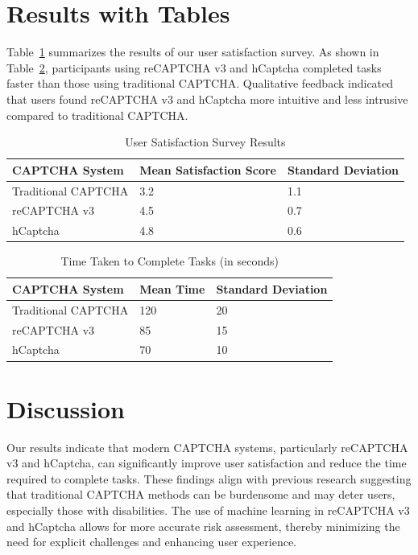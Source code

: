 \documentclass{article}
\begin{document}
\section{Results with Tables}
Table~\ref{tab:user_satisfaction} summarizes the results of our user satisfaction survey. As shown in Table~\ref{tab:task_time}, participants using reCAPTCHA v3 and hCaptcha completed tasks faster than those using traditional CAPTCHA. Qualitative feedback indicated that users found reCAPTCHA v3 and hCaptcha more intuitive and less intrusive compared to traditional CAPTCHA.

\begin{table}[htbp]
\centering
\caption{User Satisfaction Survey Results}
\label{tab:user_satisfaction}
\begin{tabular}{@{}lll@{}}
\toprule
\textbf{CAPTCHA System} & \textbf{Mean Satisfaction Score} & \textbf{Standard Deviation} \\ \midrule
Traditional CAPTCHA & 3.2 & 1.1 \\
reCAPTCHA v3 & 4.5 & 0.7 \\
hCaptcha & 4.8 & 0.6 \\ \bottomrule
\end{tabular}
\end{table}

\begin{table}[htbp]
\centering
\caption{Time Taken to Complete Tasks (in seconds)}
\label{tab:task_time}
\begin{tabular}{@{}lll@{}}
\toprule
\textbf{CAPTCHA System} & \textbf{Mean Time} & \textbf{Standard Deviation} \\ \midrule
Traditional CAPTCHA & 120 & 20 \\
reCAPTCHA v3 & 85 & 15 \\
hCaptcha & 70 & 10 \\ \bottomrule
\end{tabular}
\end{table}

\section{Discussion}
Our results indicate that modern CAPTCHA systems, particularly reCAPTCHA v3 and hCaptcha, can significantly improve user satisfaction and reduce the time required to complete tasks. These findings align with previous research suggesting that traditional CAPTCHA methods can be burdensome and may deter users, especially those with disabilities. The use of machine learning in reCAPTCHA v3 and hCaptcha allows for more accurate risk assessment, thereby minimizing the need for explicit challenges and enhancing user experience.
\end{document}
